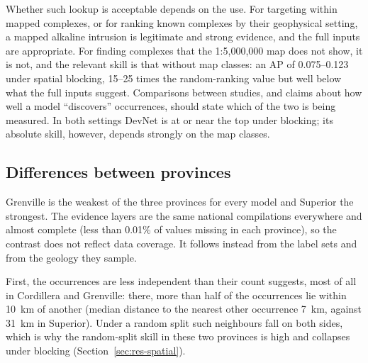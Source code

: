 \documentclass[pdflatex,sn-apa]{sn-jnl}
\begin{document}
Whether such lookup is acceptable depends on the use. For targeting within mapped complexes, or for ranking known complexes by their geophysical setting, a mapped alkaline intrusion is legitimate and strong evidence, and the full inputs are appropriate. For finding complexes that the 1:5,000,000 map does not show, it is not, and the relevant skill is that without map classes: an AP of 0.075--0.123 under spatial blocking, 15--25 times the random-ranking value but well below what the full inputs suggest. Comparisons between studies, and claims about how well a model ``discovers'' occurrences, should state which of the two is being measured. In both settings DevNet is at or near the top under blocking; its absolute skill, however, depends strongly on the map classes.

\subsection{Differences between provinces}\label{sec:disc-provinces}

Grenville is the weakest of the three provinces for every model and Superior the strongest. The evidence layers are the same national compilations everywhere and almost complete (less than 0.01\% of values missing in each province), so the contrast does not reflect data coverage. It follows instead from the label sets and from the geology they sample.

First, the occurrences are less independent than their count suggests, most of all in Cordillera and Grenville: there, more than half of the occurrences lie within 10~km of another (median distance to the nearest other occurrence 7~km, against 31~km in Superior). Under a random split such neighbours fall on both sides, which is why the random-split skill in these two provinces is high and collapses under blocking (Section~\ref{sec:res-spatial}).
\end{document}
